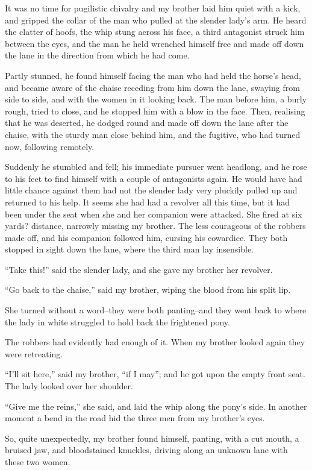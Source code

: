 It was no time for pugilistic chivalry and my brother laid him
quiet with a kick, and gripped the collar of the man who pulled at
the slender lady's arm. He heard the clatter of hoofs, the whip
stung across his face, a third antagonist struck him between the
eyes, and the man he held wrenched himself free and made off down
the lane in the direction from which he had come.

Partly stunned, he found himself facing the man who had held the
horse's head, and became aware of the chaise receding from him down
the lane, swaying from side to side, and with the women in it
looking back. The man before him, a burly rough, tried to close,
and he stopped him with a blow in the face. Then, realising that he
was deserted, he dodged round and made off down the lane after the
chaise, with the sturdy man close behind him, and the fugitive, who
had turned now, following remotely.

Suddenly he stumbled and fell; his immediate pursuer went headlong,
and he rose to his feet to find himself with a couple of
antagonists again. He would have had little chance against them had
not the slender lady very pluckily pulled up and returned to his
help. It seems she had had a revolver all this time, but it had
been under the seat when she and her companion were attacked. She
fired at six yards? distance, narrowly missing my brother. The less
courageous of the robbers made off, and his companion followed him,
cursing his cowardice. They both stopped in sight down the lane,
where the third man lay insensible.

``Take this!'' said the slender lady, and she gave my brother her
revolver.

``Go back to the chaise,'' said my brother, wiping the blood from his
split lip.

She turned without a word--they were both panting--and they went
back to where the lady in white struggled to hold back the
frightened pony.

The robbers had evidently had enough of it. When my brother looked
again they were retreating.

``I'll sit here,'' said my brother, ``if I may''; and he got upon the
empty front seat. The lady looked over her shoulder.

``Give me the reins,'' she said, and laid the whip along the pony's
side. In another moment a bend in the road hid the three men from
my brother's eyes.

So, quite unexpectedly, my brother found himself, panting, with a
cut mouth, a bruised jaw, and bloodstained knuckles, driving along
an unknown lane with these two women.

